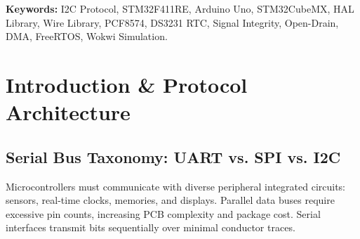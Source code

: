 \documentclass[11pt,a4paper,oneside]{report}
\begin{document}
\vspace{1cm}
\noindent\textbf{Keywords:} I2C Protocol, STM32F411RE, Arduino Uno, STM32CubeMX, HAL Library, Wire Library, PCF8574, DS3231 RTC, Signal Integrity, Open-Drain, DMA, FreeRTOS, Wokwi Simulation.

\newpage
\tableofcontents
\newpage
\listoftables
\newpage
\listoffigures

\newpage
{}
\setcounter{page}{1}

\chapter{Introduction \& Protocol Architecture}

\section{Serial Bus Taxonomy: UART vs. SPI vs. I2C}
Microcontrollers must communicate with diverse peripheral integrated circuits: sensors, real-time clocks, memories, and displays. Parallel data buses require excessive pin counts, increasing PCB complexity and package cost. Serial interfaces transmit bits sequentially over minimal conductor traces.
\end{document}
